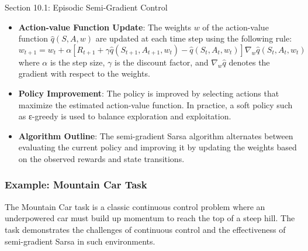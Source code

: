 \begin{notes}{Section 10.1: Episodic Semi-Gradient Control}
\begin{highlight}
        \begin{itemize}
            \item \textbf{Action-value Function Update}: The weights $w$ of the action-value function $\hat{q}(S, A, w)$ are updated at each time step using the following rule:
            \[
            w_{t+1} = w_t + \alpha \left[ R_{t+1} + \gamma \hat{q}(S_{t+1}, A_{t+1}, w_t) - \hat{q}(S_t, A_t, w_t) \right] \nabla_w \hat{q}(S_t, A_t, w_t)
            \]
            where $\alpha$ is the step size, $\gamma$ is the discount factor, and $\nabla_w \hat{q}$ denotes the gradient with respect to the weights.
            \item \textbf{Policy Improvement}: The policy is improved by selecting actions that maximize the estimated action-value function. In practice, a soft policy such as ε-greedy is used to balance exploration 
            and exploitation.
            \item \textbf{Algorithm Outline}: The semi-gradient Sarsa algorithm alternates between evaluating the current policy and improving it by updating the weights based on the observed rewards and 
            state transitions.
        \end{itemize}
    
    \end{highlight}
    
    \subsubsection*{Example: Mountain Car Task}
    
    The Mountain Car task is a classic continuous control problem where an underpowered car must build up momentum to reach the top of a steep hill. The task demonstrates the challenges of continuous control 
    and the effectiveness of semi-gradient Sarsa in such environments.
    
    \begin{highlight}
    

\end{highlight}
\end{notes}
